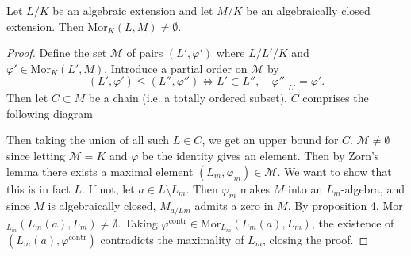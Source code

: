 \begin{cor}
Let $L/K$ be an algebraic extension and let $M/K$ be an algebraically closed extension. Then Mor$_K(L,M) \neq \emptyset$.
\end{cor}

\begin{proof}
Define the set $\mathcal{M}$ of pairs $(L', \varphi')$ where $L/L'/K$ and $\varphi' \in \text{Mor}_K(L', M)$. Introduce a partial order on $\mathcal{M}$ by 
\[(L', \varphi') \leq (L'', \varphi'') \Leftrightarrow L' \subset L'', \quad \left. \varphi''\right|_{L'} = \varphi'.\]
Then let $C \subset M$ be a chain (i.e. a totally ordered subset). $C$ comprises the following diagram
\begin{center}
\end{center}
Then taking the union of all such $L \in C$, we get an upper bound for $C$. $\mathcal{M} \neq \emptyset$ since letting $\mathcal{M} = K$ and $\varphi$ be the identity gives an element. Then by Zorn's lemma there exists a maximal element $(L_m, \varphi_m) \in \mathcal{M}$. We want to show that this is in fact $L$. If not, let $a \in L \setminus L_m$. Then $\varphi_m$ makes $M$ into an $L_m$-algebra, and since $M$ is algebraically closed, $M_{a/Lm}$ admits a zero in $M$. By proposition 4, Mor$_{L_m}(L_m(a), L_m) \neq \emptyset$. Taking $\varphi^{\text{contr}} \in \text{Mor}_{L_m}(L_m(a), L_m)$, the existence of $(L_m(a), \varphi^{\text{contr}})$ contradicts the maximality of $L_m$, closing the proof.
\end{proof}